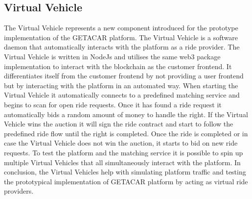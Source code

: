 \subsection{Virtual Vehicle}
The Virtual Vehicle represents a new component introduced for the prototype implementation of the GETACAR platform. The Virtual Vehicle is a software daemon that automatically interacts with the platform as a ride provider. The Virtual Vehicle is written in NodeJs and utilises the same web3 package implementation to interact with the blockchain as the customer frontend. It differentiates itself from the customer frontend by not providing a user frontend but by interacting with the platform in an automated way. When starting the Virtual Vehicle it automatically connects to a predefined matching service and begins to scan for open ride requests. Once it has found a ride request it automatically bids a random amount of money to handle the right. If the Virtual Vehicle wins the auction it will sign the ride contract and start to follow the predefined ride flow until the right is completed. Once the ride is completed or in case the Virtual Vehicle does not win the auction, it starts to bid on new ride requests. To test the platform and the matching service it is possible to spin up multiple Virtual Vehicles that all simultaneously interact with the platform. 
In conclusion, the Virtual Vehicles help with simulating platform traffic and testing the prototypical implementation of GETACAR platform by acting as virtual ride providers. 